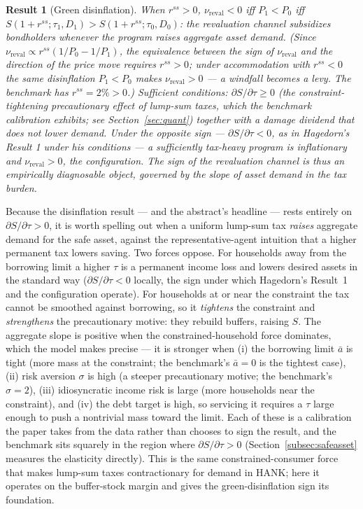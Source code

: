 \documentclass[12pt]{article}
\newtheorem{result}{Result}
\newcommand{\Sfun}{S}
\begin{document}
\begin{result}[Green disinflation]\label{res:disinflation}
When $r^{ss}>0$, $\nu_{\mathrm{reval}}<0$ iff $P_1<P_0$ iff
$\Sfun(1+r^{ss};\tau_1,D_1) > \Sfun(1+r^{ss};\tau_0,D_0)$: the revaluation
channel \emph{subsidizes} bondholders whenever the program raises aggregate
asset demand. (Since $\nu_{\mathrm{reval}}\propto r^{ss}(1/P_0-1/P_1)$, the
equivalence between the sign of $\nu_{\mathrm{reval}}$ and the direction of
the price move requires $r^{ss}>0$; under accommodation with $r^{ss}<0$ the
same disinflation $P_1<P_0$ makes $\nu_{\mathrm{reval}}>0$ --- a windfall
becomes a levy. The benchmark has $r^{ss}=2\%>0$.) Sufficient conditions: $\partial\Sfun/\partial\tau\ge0$
(the constraint-tightening precautionary effect of lump-sum taxes, which the
benchmark calibration exhibits; see Section~\ref{sec:quant}) together with a
damage dividend that does not lower demand. Under the opposite sign
--- $\partial\Sfun/\partial\tau<0$, as in Hagedorn's Result 1 under his
conditions --- a sufficiently tax-heavy program is inflationary and
$\nu_{\mathrm{reval}}>0$, the \citet{angeletos2024deficits} configuration.
The sign of the revaluation channel is thus an \emph{empirically diagnosable}
object, governed by the slope of asset demand in the tax burden.
\end{result}

Because the disinflation result --- and the abstract's headline --- rests
entirely on $\partial\Sfun/\partial\tau>0$, it is worth spelling out when a
uniform lump-sum tax \emph{raises} aggregate demand for the safe asset,
against the representative-agent intuition that a higher permanent tax lowers
saving. Two forces oppose. For households away from the borrowing limit a
higher $\tau$ is a permanent income loss and lowers desired assets in the
standard way ($\partial\Sfun/\partial\tau<0$ locally, the sign under which
Hagedorn's Result~1 and the \citet{angeletos2024deficits} configuration
operate). For households at or near the constraint the tax cannot be smoothed
against borrowing, so it \emph{tightens} the constraint and \emph{strengthens}
the precautionary motive: they rebuild buffers, raising $\Sfun$. The
aggregate slope is positive when the constrained-household force dominates,
which the model makes precise --- it is stronger when (i) the borrowing limit
$\bar a$ is tight (more mass at the constraint; the benchmark's $\bar a=0$ is
the tightest case), (ii) risk aversion $\sigma$ is high (a steeper
precautionary motive; the benchmark's $\sigma=2$), (iii) idiosyncratic income
risk is large (more households near the constraint), and (iv) the debt target
is high, so servicing it requires a $\tau$ large enough to push a nontrivial
mass toward the limit. Each of these is a calibration the paper takes from
the data rather than chooses to sign the result, and the benchmark sits
squarely in the region where $\partial\Sfun/\partial\tau>0$
(Section~\ref{subsec:safeasset} measures the elasticity directly). This is
the same constrained-consumer force that makes lump-sum taxes contractionary
for demand in HANK; here it operates on the buffer-stock margin and gives the
green-disinflation sign its foundation.
\end{document}

